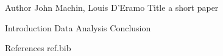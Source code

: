 Author John Machin, Louis D'Eramo
Title a short paper

Introduction
Data
Analysis
Conclusion 

References 
ref.bib